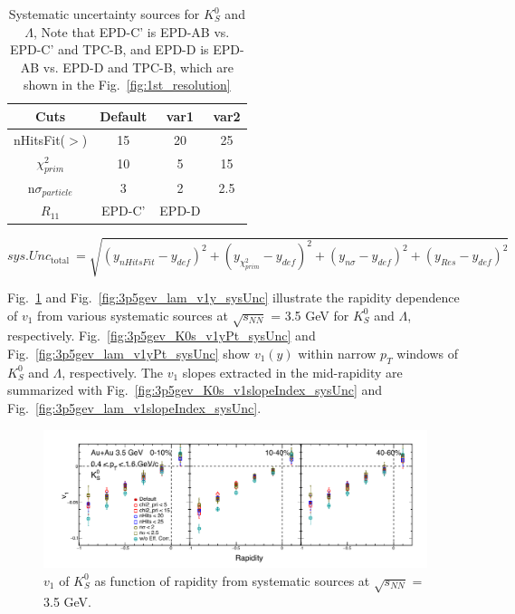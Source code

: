 \begin{table}
    \centering
    \begin{tabular}{|c|c|c|c|} \hline  
         Cuts&  Default&  var1& var2\\ \hline  
         nHitsFit($>$)&  15&  20& 25\\
 $\chi^2_{prim}$& 10& 5&15\\\hline  
         n$\sigma_{particle}$&  3&  2& 2.5\\ \hline 
         $R_{11}$&  EPD-C'&  EPD-D& \\ \hline 
    \end{tabular}
    \caption{Systematic uncertainty sources for $K^0_S$ and $\Lambda$, Note that EPD-C' is EPD-AB vs. EPD-C' and TPC-B, and EPD-D is EPD-AB vs. EPD-D and TPC-B,
    which are shown in the Fig.~\ref{fig:1st_resolution}}
    \label{tab:lamK0s_sysUnc}
\end{table}



\begin{equation}
s y s. Unc_{\text {total }}=\sqrt{\left(y_{n H i tsFit}-y_{d e f}\right)^2+\left(y_{\chi^2_{prim}}-y_{d e f}\right)^2+\left(y_{n \sigma}-y_{d e f}\right)^2+\left(y_{Res}-y_{d e f}\right)^2}
\label{eq:sysUnc_lamK0s}
\end{equation}

Fig.~\ref{fig:3p5gev_K0s_v1y_sysUnc} and Fig.~\ref{fig:3p5gev_lam_v1y_sysUnc} 
illustrate the rapidity dependence of $v_1$ from various systematic sources at $\sqrt{s_{NN}}$ = 3.5 GeV for $K^0_S$ and $\Lambda$, respectively.
Fig.~\ref{fig:3p5gev_K0s_v1yPt_sysUnc} and Fig.~\ref{fig:3p5gev_lam_v1yPt_sysUnc} show $v_1(y)$ within narrow $p_T$ windows of $K^0_S$ and $\Lambda$, respectively. 
The $v_1$ slopes extracted in the mid-rapidity are summarized with Fig.~\ref{fig:3p5gev_K0s_v1slopeIndex_sysUnc} and Fig.~\ref{fig:3p5gev_lam_v1slopeIndex_sysUnc}.


\begin{figure}[hbt!]
\centering
\includegraphics[width=0.95\linewidth]{figures/chapter03/3p5gev_K0s_v1y_sysUnc.pdf}
\caption{$v_1$ of $K^0_S$ as function of rapidity from systematic sources at $\sqrt{s_{NN}}$ = 3.5 GeV.}
\label{fig:3p5gev_K0s_v1y_sysUnc}
\end{figure}

